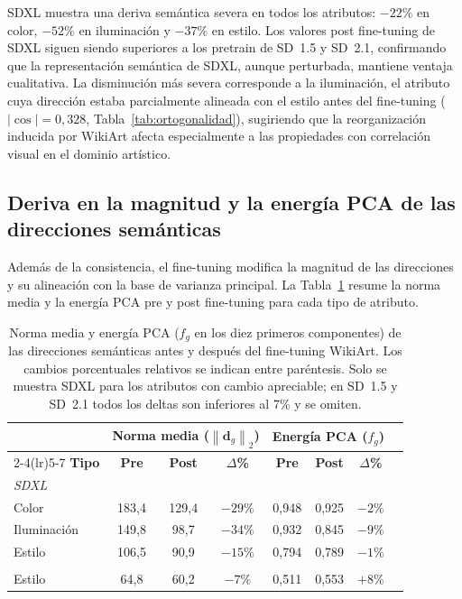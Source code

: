 \documentclass[12pt, a4paper, twoside]{book}
\newcommand{\norm}[1]{\left\|#1\right\|_2}
\begin{document}
SDXL muestra una deriva semántica severa en todos los atributos: $-22\%$ en color, $-52\%$
en iluminación y $-37\%$ en estilo. Los valores post fine-tuning de SDXL siguen siendo
superiores a los pretrain de SD~1.5 y SD~2.1, confirmando que la representación semántica
de SDXL, aunque perturbada, mantiene ventaja cualitativa. La disminución más severa
corresponde a la iluminación, el atributo cuya dirección estaba parcialmente alineada con
el estilo antes del fine-tuning ($|\cos| = 0{,}328$, Tabla~\ref{tab:ortogonalidad}), sugiriendo
que la reorganización inducida por WikiArt afecta especialmente a las propiedades con
correlación visual en el dominio artístico.

\subsection{Deriva en la magnitud y la energía PCA de las direcciones semánticas}
\label{subsec:res:deriva_normas_energia}

Además de la consistencia, el fine-tuning modifica la magnitud de las direcciones y su
alineación con la base de varianza principal. La Tabla~\ref{tab:deriva_normas_energia}
resume la norma media y la energía PCA pre y post fine-tuning para cada tipo de atributo.

\begin{table}[htb]
\centering
\caption{Norma media y energía PCA ($f_g$ en los diez primeros componentes) de las
direcciones semánticas antes y después del fine-tuning WikiArt. Los cambios porcentuales
relativos se indican entre paréntesis. Solo se muestra SDXL para los atributos con cambio
apreciable; en SD~1.5 y SD~2.1 todos los deltas son inferiores al 7\% y se omiten.}
\label{tab:deriva_normas_energia}
\small
\begin{tabular}{lccccccc}
\toprule
 & \multicolumn{3}{c}{\textbf{Norma media ($\norm{\mathbf{d}_g}$)}} &
\multicolumn{3}{c}{\textbf{Energía PCA ($f_g$)}} \\
\cmidrule(lr){2-4}\cmidrule(lr){5-7}
\textbf{Tipo} & \textbf{Pre} & \textbf{Post} & \textbf{$\Delta$\%} &
\textbf{Pre} & \textbf{Post} & \textbf{$\Delta$\%} \\
\midrule
\multicolumn{7}{l}{\textit{SDXL}} \\
Color       & 183,4 & 129,4 & $-29\%$ & 0,948 & 0,925 & $-2\%$ \\
Iluminación & 149,8 & \phantom{1}98,7 & $-34\%$ & 0,932 & 0,845 & $-9\%$ \\
Estilo      & 106,5 & \phantom{1}90,9 & $-15\%$ & 0,794 & 0,789 & $-1\%$ \\
\addlinespace
\multicolumn{7}{l}{\textit{SD~2.1} (referencia)} \\
Estilo      & \phantom{1}64,8 & \phantom{1}60,2 & $-7\%$ & 0,511 & 0,553 & $+8\%$ \\
\bottomrule
\end{tabular}
\end{table}
\end{document}
